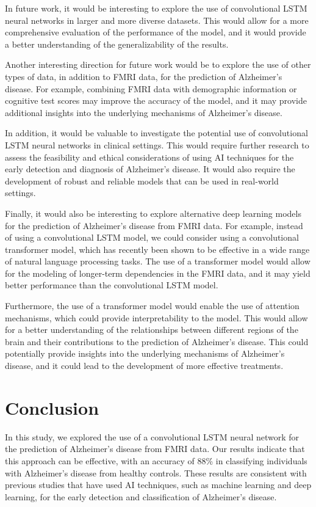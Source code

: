 \documentclass[10pt]{article}
\begin{document}
	In future work, it would be interesting to explore the use of convolutional LSTM neural networks in larger and more diverse datasets. This would allow for a more comprehensive evaluation of the performance of the model, and it would provide a better understanding of the generalizability of the results.

	Another interesting direction for future work would be to explore the use of other types of data, in addition to FMRI data, for the prediction of Alzheimer's disease. For example, combining FMRI data with demographic information or cognitive test scores may improve the accuracy of the model, and it may provide additional insights into the underlying mechanisms of Alzheimer's disease.

	In addition, it would be valuable to investigate the potential use of convolutional LSTM neural networks in clinical settings. This would require further research to assess the feasibility and ethical considerations of using AI techniques for the early detection and diagnosis of Alzheimer's disease. It would also require the development of robust and reliable models that can be used in real-world settings.

	Finally, it would also be interesting to explore alternative deep learning models for the prediction of Alzheimer's disease from FMRI data. For example, instead of using a convolutional LSTM model, we could consider using a convolutional transformer model, which has recently been shown to be effective in a wide range of natural language processing tasks. The use of a transformer model would allow for the modeling of longer-term dependencies in the FMRI data, and it may yield better performance than the convolutional LSTM model.

	Furthermore, the use of a transformer model would enable the use of attention mechanisms, which could provide interpretability to the model. This would allow for a better understanding of the relationships between different regions of the brain and their contributions to the prediction of Alzheimer's disease. This could potentially provide insights into the underlying mechanisms of Alzheimer's disease, and it could lead to the development of more effective treatments.

	\section{Conclusion}

	In this study, we explored the use of a convolutional LSTM neural network for the prediction of Alzheimer's disease from FMRI data. Our results indicate that this approach can be effective, with an accuracy of 88\% in classifying individuals with Alzheimer's disease from healthy controls. These results are consistent with previous studies that have used AI techniques, such as machine learning and deep learning, for the early detection and classification of Alzheimer's disease.
\end{document}
